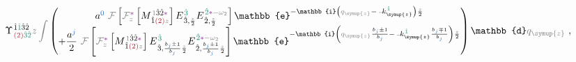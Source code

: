 \begin{subequations}
\begin{align}
		&\hspace*{-1.8em} \Upsilon^{\;\! \hat{1} \textcolor{PineGreen}{\hat{1}} \hat{3} \hat{2} }_{\;\! \textcolor{Maroon}{(2)} \textcolor{PineGreen}{\hat{3} \hat{2}} } \mathcolor{gray}{z} \mathcolor{gray}{\int} \begin{pmatrix} a^{\textcolor{NavyBlue}{0}} ~ \mathcolor{gray}{\mathcal F} \left[ \mathcolor{gray}{\mathcal F_{z}^{\textcolor{Plum}{*}}} \left[ {M}^{\;\! \mathcolor{gray}{1} \hat{3} \hat{2} \textcolor{Plum}{*} }_{\;\! \hat{1} \textcolor{Maroon}{(2)} \mathcolor{gray}{z} } \right] {E}^{\;\! \textcolor{PineGreen}{\hat{3}}}_{\;\! \hat{3}, \frac{ \mathcolor{gray}{z} }{ 2 }} {E}^{\;\! \textcolor{PineGreen}{\hat{2}} \textcolor{Plum}{*} \mathcolor{gray}{- \omega_2} }_{\;\! \hat{2}, \frac{ \mathcolor{gray}{z} }{ 2 }} \right] \mathbb{e}^{- \mathbb{i} \left( \mathcolor{gray}{q_{\symup{z}}} - \xint{\begin{smallmatrix} ~ \\ {}^{}_{\mathcolor{gray}{-}} \\ ~ \end{smallmatrix}}{15}{k}_{\symup{z}}^{\;\! \textcolor{PineGreen}{\hat{1}} } \right) \frac{ \mathcolor{gray}{z} }{ 2 }} \\ + \dfrac{a^{\textcolor{NavyBlue}{j}}}{2} ~ \mathcolor{gray}{\mathcal F} \left[ \mathcolor{gray}{\mathcal F_{z}^{\textcolor{Plum}{*}}} \left[ {M}^{\;\! \mathcolor{gray}{1} \hat{3} \hat{2} \textcolor{Plum}{*} }_{\;\! \hat{1} \textcolor{Maroon}{(2)} \mathcolor{gray}{z} } \right] {E}^{\;\! \textcolor{PineGreen}{\hat{3}}}_{\;\! \hat{3}, \frac{b_{\textcolor{NavyBlue}{j}} \pm 1}{b_{\textcolor{NavyBlue}{j}}} \frac{ \mathcolor{gray}{z} }{ 2 }} {E}^{\;\! \textcolor{PineGreen}{\hat{2}} \textcolor{Plum}{*} \mathcolor{gray}{- \omega_2} }_{\;\! \hat{2}, \frac{b_{\textcolor{NavyBlue}{j}} \pm 1}{b_{\textcolor{NavyBlue}{j}}} \frac{ \mathcolor{gray}{z} }{ 2 }} \right] \mathbb{e}^{- \mathbb{i} \left( \mathcolor{gray}{q_{\symup{z}}} \frac{b_{\textcolor{NavyBlue}{j}} \pm 1}{b_{\textcolor{NavyBlue}{j}}} - \xint{\begin{smallmatrix} ~ \\ {}^{}_{\mathcolor{gray}{-}} \\ ~ \end{smallmatrix}}{15}{k}_{\symup{z}}^{\;\! \textcolor{PineGreen}{\hat{1}} } \frac{b_{\textcolor{NavyBlue}{j}} \mp 1}{b_{\textcolor{NavyBlue}{j}}} \right) \frac{ \mathcolor{gray}{z} }{ 2 } } \end{pmatrix} \mathbb{d} \mathcolor{gray}{q_{\symup{z}}} \label{eq:down-scalar-G-EE-132-discrete-NLAST_Chord_b}~,
	\end{align}
\end{subequations}

